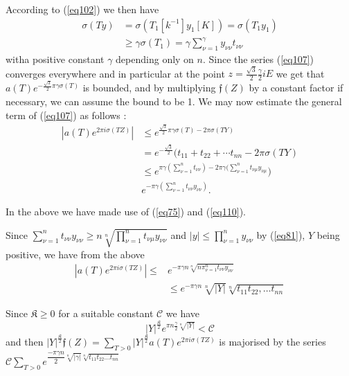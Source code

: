 According to (\ref{eq102}) we then have 
\begin{align*}
\sigma (Ty) & = \sigma (T_1[k^{-1}] y_1[K]) = \sigma (T_1 y_1)\\
& \geq \gamma \sigma (T_1) = \gamma \sum^{\gamma}_{\nu = 1} y_{ \nu
  \nu } t_{\nu \nu} \tag{110}\label{eq110} 
\end{align*}
with\pageoriginale a positive constant $\gamma$ depending only on
$n$. Since the 
series (\ref{eq107}) converges everywhere and in particular at the point $z
= \frac{\sqrt{3}}{2} \frac {\gamma}{2} i E$ we get that $a (T)
e^{-\frac{\sqrt{3}}{2} \pi \gamma \sigma (T)}$ is bounded, and by
multiplying $\mathfrak{f}(Z)$ by a constant factor if necessary, we can
assume the bound to be 1. We may now estimate the general term of
(\ref{eq107}) as follows : 
\begin{align*}  
| a (T) e^{2 \pi i \sigma ( TZ)} | & \leq e^{\frac{\sqrt{3}}{2} \pi
  \gamma \sigma (T) - 2 \pi  \sigma ( TY)} \\ 
& =  e^{-\frac{\sqrt{3}}{2}} (t_{11} + t_{22} + \cdots t_{nn} - 2 \pi
\sigma (TY)\\ 
& \leq e^{\pi \gamma (\sum^n_{\nu =1} t_{\nu \nu }) -2 \pi \gamma
  (\sum^n_{\nu =1} t_{\nu \mu } y_{\nu \mu}})\\ 
& e^{-\pi \gamma (\sum^n_{\nu =1} t_{\nu \nu } y_{\nu \nu })}. 
\end{align*}

In the above we have made use of (\ref{eq75}) and (\ref{eq110}).

Since $\sum\limits^n_{\nu =1} t_{\nu \nu} y_{\nu \nu } \geq n
\sqrt[n]{\prod^n_{\nu =1}t_{\nu \mu } y_{\nu \nu }}$ and $|y| \leq
\prod\limits^{n}_{\nu =1} y_{\nu \nu}$ by (\ref{eq81}), $Y$ being positive,
we have from the above  
\begin{align*}
| a (T) e^{2 \pi i \sigma (TZ)} | \leq & e^{- \pi \gamma n \sqrt
  [n]{n \pi^n_{\nu =1}t_{\nu \nu } y_{\nu \nu }}}\\ 
& \leq e^{- \pi \gamma n } \sqrt[n]{|Y|} \sqrt[n ]{t_{11}
  t_{22}, \ldots t_{nn}} 
\end{align*}

Since $\mathfrak{K} \geq 0$ for a suitable constant $\mathscr{C} $ we
have  
$$
|Y|^{\frac{\mathfrak{K}}{2}} e^{ \pi n \frac{\gamma}{2}
  \sqrt[n]{|Y|}}< \mathscr{C} 
$$
and then $|Y|^{\frac{\mathfrak{K}}{2}} \mathfrak{f} (Z) = \sum
\limits_{ T > 0} | Y 
|^{\frac{\mathfrak{K}}{2}} a (T) e^{2 \pi i \sigma (TZ)}$ is majorised
by the series \break
$\mathscr{C} \sum\limits_{ T > 0} e^{\dfrac{- \pi \gamma
    n}{2} \sqrt[n]{| \gamma |} \sqrt[n]{t_{11} t_{22} \ldots
    t_{nn}}}$ 

